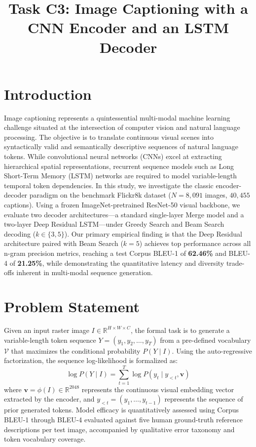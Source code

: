 \documentclass[10pt,conference,a4paper]{IEEEtran}
\title{Task C3: Image Captioning with a CNN Encoder and an LSTM Decoder}
\author{
    \IEEEauthorblockN{Syed Faran Ali \quad|\quad Roll No. 866770 \quad|\quad SAP ID: 70177784 \quad|\quad Section A}
    \IEEEauthorblockA{Department of Intelligent Systems, The University of Lahore}
    \IEEEauthorblockA{Repository: \url{https://github.com/Faran70177784/AI101-ML-Assignment} \quad|\quad Instructor: Dr. Muhammad Awais, AI Architect}
}
\begin{document}
\maketitle

\section{Introduction}
Image captioning represents a quintessential multi-modal machine learning challenge situated at the intersection of computer vision and natural language processing. The objective is to translate continuous visual scenes into syntactically valid and semantically descriptive sequences of natural language tokens. While convolutional neural networks (CNNs) excel at extracting hierarchical spatial representations, recurrent sequence models such as Long Short-Term Memory (LSTM) networks are required to model variable-length temporal token dependencies. In this study, we investigate the classic encoder-decoder paradigm on the benchmark Flickr8k dataset ($N = 8{,}091$ images, $40{,}455$ captions). Using a frozen ImageNet-pretrained ResNet-50 visual backbone, we evaluate two decoder architectures—a standard single-layer Merge model and a two-layer Deep Residual LSTM—under Greedy Search and Beam Search decoding ($k \in \{3, 5\}$). Our primary empirical finding is that the Deep Residual architecture paired with Beam Search ($k=5$) achieves top performance across all n-gram precision metrics, reaching a test Corpus BLEU-1 of \textbf{62.46\%} and BLEU-4 of \textbf{21.25\%}, while demonstrating the quantitative latency and diversity trade-offs inherent in multi-modal sequence generation.

\section{Problem Statement}
Given an input raster image $I \in \mathbb{R}^{H \times W \times C}$, the formal task is to generate a variable-length token sequence $Y = (y_1, y_2, \dots, y_T)$ from a pre-defined vocabulary $\mathcal{V}$ that maximizes the conditional probability $P(Y \mid I)$. Using the auto-regressive factorization, the sequence log-likelihood is formalized as:
\begin{equation}
\log P(Y \mid I) = \sum_{t=1}^{T} \log P(y_t \mid y_{<t}, \mathbf{v})
\end{equation}
where $\mathbf{v} = \phi(I) \in \mathbb{R}^{2048}$ represents the continuous visual embedding vector extracted by the encoder, and $y_{<t} = (y_1, \dots, y_{t-1})$ represents the sequence of prior generated tokens. Model efficacy is quantitatively assessed using Corpus BLEU-1 through BLEU-4 evaluated against five human ground-truth reference descriptions per test image, accompanied by qualitative error taxonomy and token vocabulary coverage.
\end{document}
